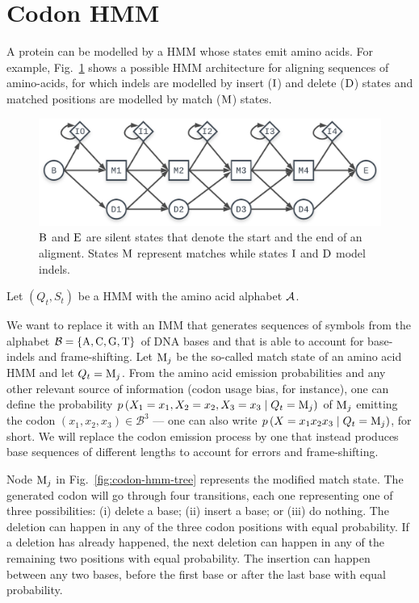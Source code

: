\section{Codon HMM}

A protein can be modelled by a HMM whose states emit amino acids.
For example, Fig.~\ref{fig:core-model} shows a possible HMM architecture for aligning sequences of
amino-acids, for which indels are modelled by insert ($\mathrm{I}$) and delete ($\mathrm{D}$) states
and matched positions are modelled by match ($\mathrm{M}$) states.

\begin{figure}[htbp]
  \centering
  \includegraphics[width=.7\linewidth]{figure/core-model}
  \caption{$\mathrm{B}$ and $\mathrm{E}$ are silent states that denote the start and the end of an
  aligment. States $\mathrm{M}$ represent matches while states $\mathrm{I}$ and $\mathrm{D}$ model
  indels.}\label{fig:core-model}
\end{figure}


Let $(Q_t, S_t)$ be a HMM with the amino acid alphabet $\mathcal{A}$.

We want to replace it with an IMM
that generates sequences of symbols from the alphabet $\mathcal{B} = \{\mathrm{A}, \mathrm{C}, \mathrm{G},
\mathrm{T}\}$ of DNA bases and that is able to account for base-indels and frame-shifting. Let
$\mathrm{M}_j$ be the so-called match state of an amino acid HMM and let $Q_t=\mathrm{M}_j$. From the
amino acid emission probabilities and any other relevant source of information (codon usage bias,
for instance), one can define the probability $p\left(X_1=x_1, X_2=x_2, X_3=x_3\;\middle|\; Q_t=\mathrm{M}_j\right)$
of $\mathrm{M}_j$ emitting the codon $(x_1, x_2, x_3) \in \mathcal B^3$ --- one can also write
$p\left(X=x_1x_2x_3\;\middle|\; Q_t=\mathrm{M}_j\right)$, for short. We will replace the codon emission process by one
that instead produces base sequences of different lengths to account for errors and frame-shifting.

Node $\mathrm{M}_j$ in Fig.~\ref{fig:codon-hmm-tree} represents the modified match state.
The generated codon will go through four transitions, each one representing one of three possibilities: (i) delete a base; (ii) insert a base; or (iii) do nothing.
The deletion can happen in any of the three codon positions with equal probability.
If a deletion has already happened, the next deletion can happen in any of the remaining two positions with equal probability.
The insertion can happen between any two bases, before the first base or after the last base with equal probability.


